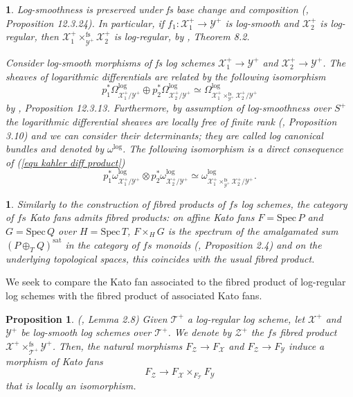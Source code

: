 \documentclass{amsart}%
\numberwithin{equation}{subsection}
\theoremstyle{plain2}
\newtheorem{prop}[equation]{Proposition}
\theoremstyle{definition2}
\theoremstyle{stepstyle}
\theoremstyle{point}
\theoremstyle{subpoint}
\newtheorem{subpoint}[equation]{}%
\newcommand{\spa}[1]{\begin{subpoint}#1\end{subpoint}}           %
\newcommand{\cX}{\ensuremath{\mathscr{X}}}
\newcommand{\cY}{\ensuremath{\mathscr{Y}}}
\newcommand{\cZ}{\ensuremath{\mathscr{Z}}}
\renewcommand{\cY}{\ensuremath{\mathscr{Y}}}
\newcommand{\Spec}{\ensuremath{\mathrm{Spec}\,}}
\begin{document}
\spa{Log-smoothness is preserved under fs base change and composition (\cite{GabberRamero}, Proposition 12.3.24). In particular, if $f_1: \cX_1^+ \rightarrow \cY^+$ is log-smooth and $\cX_2^+$ is log-regular, then $\cX_1^+\times^{\text{fs}}_{\cY^+} \cX_2^+$ is log-regular, by \cite{Kato1994a}, Theorem 8.2.

Consider log-smooth morphisms of fs log schemes $\cX_1^+ \rightarrow \cY^+$ and $\cX_2^+ \rightarrow \cY^+$. The sheaves of logarithmic differentials are related by the following isomorphism \begin{equation} \label{equ kahler diff product}
p_1^* \Omega^{\log}_{\cX_1^+/\cY^+} \oplus p_2^* \Omega^{\log}_{\cX_2^+/ \cY^+} \simeq \Omega^{\log}_{\cX_1^+\times^{\text{fs}}_{\cY^+} \cX_2^+ /\cY^+}\end{equation} by \cite{GabberRamero}, Proposition 12.3.13. Furthermore, by assumption of log-smoothness over $S^+$ the logarithmic differential sheaves are locally free of finite rank (\cite{Kato1994a}, Proposition 3.10) and we can consider their determinants; they are called log canonical bundles and denoted by $\omega^{\log}$. The following isomorphism is a direct consequence of (\ref{equ kahler diff product}) \begin{equation} \label{equ log can bundles}
p_1^* \omega^{\log}_{\cX_1^+/\cY^+} \otimes p_2^* \omega^{\log}_{\cX_2^+/ \cY^+} \simeq \omega^{\log}_{\cX_1^+\times^{\text{fs}}_{\cY^+} \cX_2^+ /\cY^+}.\end{equation} }

\spa{Similarly to the construction of fibred products of $fs$ log schemes, the category of $fs$ Kato fans admits fibred products: on affine Kato fans $F=\Spec P$ and $G=\Spec Q$ over $H=\Spec T$, $F\times_{H}G$ is the spectrum of the amalgamated sum $(P \oplus_T Q)^{\text{sat}}$ in the category of $fs$ monoids (\cite{Ulirsch2016}, Proposition 2.4) and on the underlying topological spaces, this coincides with the usual fibred product.}
We seek to compare the Kato fan associated to the fibred product of log-regular log schemes with the fibred product of associated Kato fans.
\begin{prop} \label{local isomo kato fan product}(\cite{Saito2004}, Lemma 2.8) Given $\mathscr{T}^+$ a log-regular log scheme, let $\cX^+$ and $\cY^+$ be log-smooth log schemes over $\mathscr{T}^+$. We denote by $\cZ^+$ the $fs$ fibred product $\cX^+\times^{\text{fs}}_{\mathscr{T}^+} \cY^+$. Then, the natural morphisms $F_{\cZ}\to F_{\cX}$ and $F_{\cZ}\to F_{\cY}$ induce a morphism of Kato fans \begin{equation} \label{equ local isomo kato fans}
F_{\cZ} \rightarrow F_{\cX} \times_{F_{\mathscr{T}}} F_{\cY}
\end{equation} that is locally an isomorphism.
\end{prop}
\end{document}
